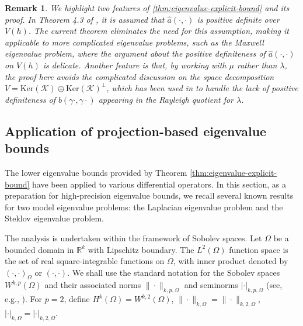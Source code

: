 \documentclass[a4,11pt]{article}
\numberwithin{equation}{section}
\newtheorem{remark}[theorem]{Remark}
\begin{document}
\medskip


\begin{remark}
\label{remark:direct-lower-bound}
We highlight two features of  \cref{thm:eigenvalue-explicit-bound} and its proof. 
In Theorem 4.3 of \cite{Liu-2015}, it is assumed that $\widehat{a}(\cdot, \cdot)$ is positive definite over $V(h)$. 
The current theorem eliminates the need for this assumption, making it applicable to more complicated eigenvalue problems, such as the Maxwell eigenvalue problem, where the argument about the positive definiteness of $\widehat{a}(\cdot, \cdot)$ on $V(h)$ is delicate.
Another feature is that, by working with $\mu$ rather than $\lambda$, the proof here avoids the complicated discussion on the space decomposition $V = \mbox{Ker}(\mathcal{K} ) \oplus  \mbox{Ker}(\mathcal{K} )^\perp$, which has been used in \cite{You-Xie-Liu-2019} to handle the lack of positive  definiteness of $b(\gamma\cdot, \gamma\cdot)$ appearing in the Rayleigh quotient for $\lambda$.
\end{remark}

\medskip

\subsection{Application of projection-based eigenvalue bounds}
\label{section-steklov}

The lower eigenvalue bounds provided by Theorem \ref{thm:eigenvalue-explicit-bound} have been applied to various differential operators. 
In this section, as a preparation for high-precision eigenvalue bounds, we recall several known results for two model eigenvalue problems: the Laplacian eigenvalue problem and the Steklov eigenvalue problem.

The analysis is undertaken within the framework of Sobolev spaces.
Let $\Omega$ be a bounded domain in $\mathbb{R}^{k}$  with Lipschitz boundary. 
The $L^2(\Omega)$ function space is the set of real square-integrable functions on $\Omega$,
with  inner product denoted by $(\cdot, \cdot)_{\Omega}$ or $(\cdot, \cdot)$.
We shall use the standard notation for the Sobolev spaces $W^{k,p}(\Omega)$ and their
associated norms $\|\cdot\|_{k,p,\Omega}$ and seminorms $|\cdot|_{k,p,\Omega}$
(see, e.g., \cite{adams2003sobolev}).
For $p=2$, define
$H^k(\Omega)=W^{k,2}(\Omega)$, $\|\cdot \|_{k,\Omega} = \|\cdot\|_{k,2,\Omega}$, 
$|\cdot|_{k,\Omega} = |\cdot|_{k,2,\Omega}$.
\end{document}
